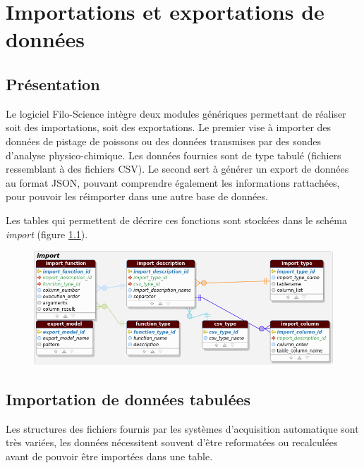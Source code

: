 \chapter{Importations et exportations de données}

\section{Présentation}

Le logiciel Filo-Science intègre deux modules génériques permettant de réaliser soit des importations, soit des exportations. 
Le premier vise à importer des données de pistage de poissons ou des données transmises par des sondes d'analyse physico-chimique. Les données fournies sont de type tabulé (fichiers ressemblant à des fichiers CSV).
Le second sert à générer un export de données au format JSON, pouvant comprendre également les informations rattachées, pour pouvoir les réimporter dans une autre base de données.

Les tables qui permettent de décrire ces fonctions sont stockées dans le schéma \textit{import} (figure \ref{fig:export_schema}).
\begin{figure}[h!]
\begin{center}
\includegraphics[width=\linewidth]{images/export_schema}
\label{fig:export_schema}
\end{center}
\end{figure}

\section{Importation de données tabulées}

Les structures des fichiers fournis par les systèmes d'acquisition automatique sont très variées, les données nécessitent souvent d'être reformatées ou recalculées avant de pouvoir être importées dans une table.

